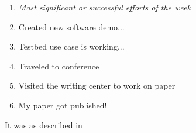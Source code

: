 \begin{enumerate}
    \item \textit{Most significant or successful efforts of the week}
    \item Created new software demo...
    \item Testbed use case is working...
    \item Traveled to conference
    \item Visited the writing center to work on paper
    \item My paper got published!

\end{enumerate}

It was as described in \cite{ab94}